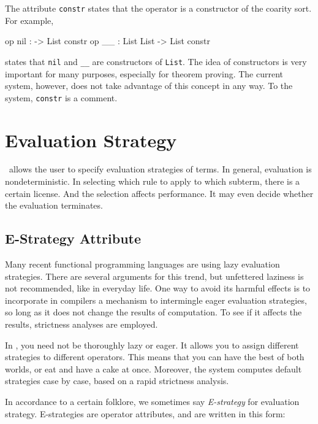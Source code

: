 \documentclass[a4paper]{memoir}
\begin{document}
The attribute \texttt{constr}
states that the operator is a constructor of
the coarity sort. For example,
\begin{vvtm}
\begin{ccode}
  op nil : -> List { constr }
  op __ : List List -> List { constr }
\end{ccode}
\end{vvtm}
states that \verb|nil| and \verb|__| are constructors of \verb|List|.
The idea of constructors is very important for many purposes, especially
for theorem proving. The current system, however, does not take advantage of
this concept in any way. To the system, \verb|constr| is a comment.

\section{Evaluation Strategy}\label{sec:p2-rew-strategy}

\cafeobj~allows the user to specify evaluation strategies of terms.
In general, evaluation is nondeterministic. In selecting which rule to
apply to which subterm, there is a certain license. And the selection
affects performance. It may even decide whether the evaluation terminates.

\subsection{E-Strategy Attribute}

Many recent functional programming languages are using lazy evaluation
strategies. There are several arguments for this trend, but unfettered
laziness
is not recommended, like in everyday life. One way to avoid its harmful
effects is to incorporate in compilers a mechanism to intermingle eager
evaluation strategies, so long as it does not change the results of
computation. To see if it affects the results, strictness analyses are
employed.

In \cafeobj, you need not be thoroughly lazy or eager. It allows you to
assign different strategies to different operators. This means that
you can have the best of both worlds, or eat and have a cake at once.
Moreover, the system computes
default strategies case by case, based on a rapid strictness analysis.

In accordance to a certain folklore, we sometimes say
{\em E-strategy} for evaluation
strategy. E-strategies are operator
attributes, and are written in this form:
\end{document}
